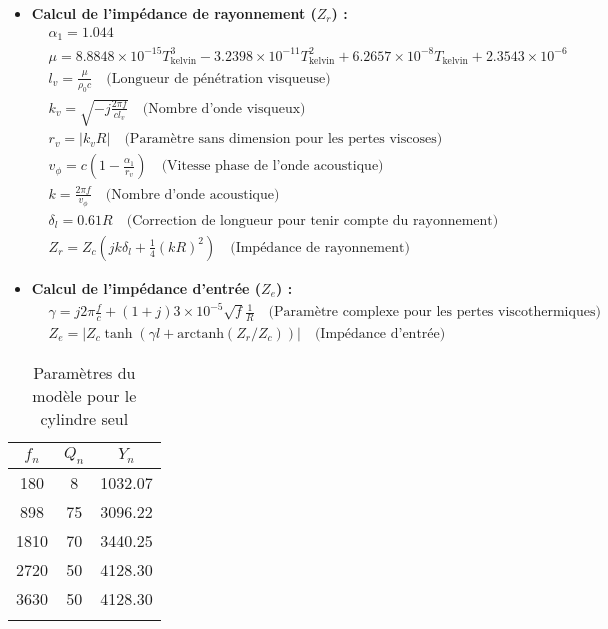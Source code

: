 \documentclass[atiam, article]{rapport} %
\begin{document}
\begin{itemize}
    \item \textbf{Calcul de l'impédance de rayonnement (\(Z_r\)) :}
    \begin{align*}
        & \alpha_1 = 1.044 \\
        & \mu = 8.8848 \times 10^{-15} T_{\text{kelvin}}^3 - 3.2398 \times 10^{-11} T_{\text{kelvin}}^2 + 6.2657 \times 10^{-8} T_{\text{kelvin}} + 2.3543 \times 10^{-6} \\
        & l_v = \frac{\mu}{\rho_0 c} \quad \text{(Longueur de pénétration visqueuse)} \\
        & k_v = \sqrt{-j \frac{2\pi f}{c l_v}} \quad \text{(Nombre d'onde visqueux)} \\
        & r_v = \lvert k_v R \rvert \quad \text{(Paramètre sans dimension pour les pertes viscoses)} \\
        & v_\phi = c \left(1 - \frac{\alpha_1}{r_v}\right) \quad \text{(Vitesse phase de l'onde acoustique)} \\
        & k = \frac{2\pi f}{v_\phi} \quad \text{(Nombre d'onde acoustique)} \\
        & \delta_l = 0.61 R \quad \text{(Correction de longueur pour tenir compte du rayonnement)} \\
        & Z_r = Z_c \left(jk\delta_l + \frac{1}{4}(kR)^2\right) \quad \text{(Impédance de rayonnement)}
    \end{align*} 
    \item \textbf{Calcul de l'impédance d'entrée (\(Z_e\)) :}
    \begin{align*}
        & \gamma = j2\pi\frac{f}{c} + (1 + j)3 \times 10^{-5} \sqrt{f} \frac{1}{R} \quad \text{(Paramètre complexe pour les pertes viscothermiques)} \\
        & Z_e = \lvert Z_c \tanh(\gamma l + \text{arctanh}(Z_r/Z_c)) \rvert \quad \text{(Impédance d'entrée)}
    \end{align*}
\end{itemize}

\begin{table}[H]
    \centering
    \begin{tabular}{ccc}
\toprule
$f_n$ & $Q_n$ & $Y_n$ \\ \midrule
180 & 8 & 1032.07 \\
898 & 75 & 3096.22 \\
1810 & 70 & 3440.25 \\
2720 & 50 & 4128.30 \\
3630 & 50 & 4128.30 \\
\bottomrule\\
    \end{tabular}
    \caption{Paramètres du modèle pour le cylindre seul}
    \label{tab:param_cylindre}
\end{table}
\end{document}
